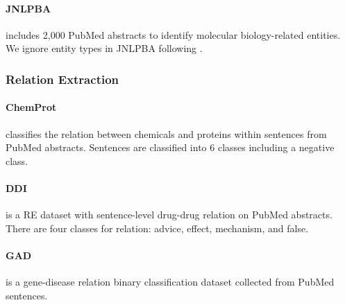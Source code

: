 \documentclass[11pt]{article}
\begin{document}
\paragraph{JNLPBA} \cite{collier-kim-2004-introduction} includes 2,000 PubMed abstracts to identify molecular biology-related entities.
We ignore entity types in JNLPBA following \citet{gu2020domain}.

\subsubsection{Relation Extraction}

\paragraph{ChemProt} \cite{krallinger2017overview} classifies the relation between chemicals and proteins within sentences from PubMed abstracts.
Sentences are classified into 6 classes including a negative class.

\paragraph{DDI} \cite{herrero2013ddi} is a RE dataset with sentence-level drug-drug relation on PubMed abstracts.
There are four classes for relation: advice, effect, mechanism, and false.

\paragraph{GAD} \cite{bravo2015extraction} is a gene-disease relation binary classification dataset collected from PubMed sentences.
\end{document}
